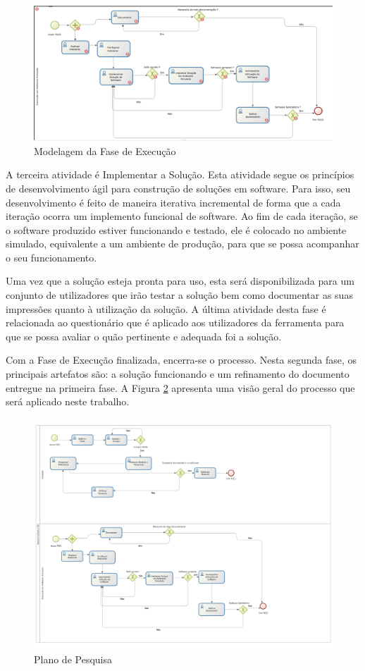\graphicspath{{figuras/}}
\begin{figure}
\centering
\includegraphics[scale=0.60]{execucao}
\caption{Modelagem da Fase de Execução}
\label{img:execucao}
\end{figure}

A terceira atividade é Implementar a Solução. Esta atividade segue os princípios de desenvolvimento ágil para construção de soluções em software. Para isso, seu desenvolvimento é feito de maneira iterativa incremental de forma que a cada iteração ocorra um implemento funcional de software. Ao fim de cada iteração, se o software produzido estiver funcionando e testado, ele é colocado no ambiente simulado, equivalente a um ambiente de produção, para que se possa acompanhar o seu funcionamento.

Uma vez que a solução esteja pronta para uso,  esta será disponibilizada para um conjunto de utilizadores que irão testar a solução bem como documentar as suas impressões quanto à utilização da solução. A última atividade desta fase é relacionada ao questionário que é aplicado aos utilizadores da ferramenta para que se possa avaliar o quão pertinente e adequada foi a solução. 

Com a Fase de Execução finalizada, encerra-se o processo. Nesta segunda fase, os principais artefatos são: a solução funcionando e um refinamento do documento entregue na primeira fase. A Figura \ref{Rotulo} apresenta uma visão geral do processo que será aplicado neste trabalho.

\graphicspath{{figuras/}}
\begin{figure}
\centering
\includegraphics[scale=0.65]{modelagem_processo.pdf}
\caption{Plano de Pesquisa}
\label{Rotulo}
\end{figure}

